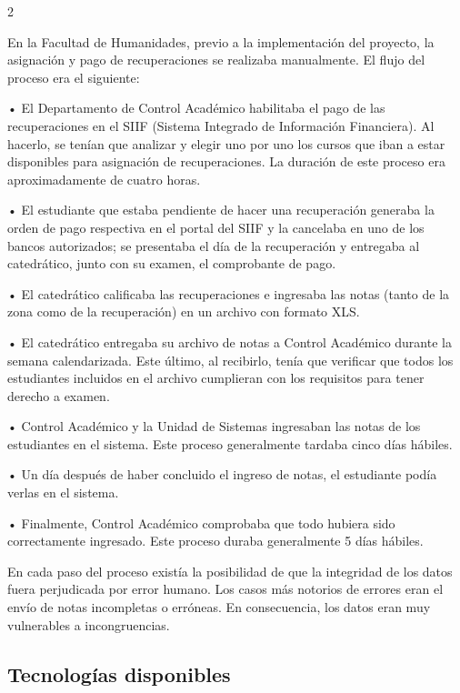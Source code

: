 \documentclass[12pt,spanish,Letterpaper,openany]{book}
\newcommand{\spacethreemilis}{\vspace{3mm}}
\newcommand{\spacetwomilis}{\vspace{2mm}}
\begin{document}
\begin {multicols}{2}
\spacetwomilis

En la Facultad de Humanidades, previo a la implementación del proyecto, la asignación y pago de recuperaciones se realizaba manualmente. El flujo del proceso era el siguiente:

• El Departamento de Control Académico habilitaba el pago de las recuperaciones en el SIIF (Sistema Integrado de Información Financiera). Al hacerlo, se tenían que analizar y elegir uno por uno los cursos que iban a estar disponibles para asignación de recuperaciones. La duración de este proceso era aproximadamente de cuatro horas.

• El estudiante que estaba pendiente de hacer una recuperación generaba la orden de pago respectiva en el portal del SIIF y la cancelaba en uno de los bancos autorizados; se presentaba el día de la recuperación y entregaba al catedrático, junto con su examen, el comprobante de pago.

\spacethreemilis
\spacethreemilis

• El catedrático calificaba las recuperaciones e ingresaba las notas (tanto de la zona como de la recuperación) en un archivo con formato XLS.

• El catedrático entregaba su archivo de notas a Control Académico durante la semana calendarizada. Este último, al recibirlo, tenía que verificar que todos los estudiantes incluidos en el archivo cumplieran con los requisitos para tener derecho a examen.

• Control Académico y la Unidad de Sistemas ingresaban las notas de los estudiantes en el sistema. Este proceso generalmente tardaba cinco días hábiles.

• Un día después de haber concluido el ingreso de notas, el estudiante podía verlas en el sistema.

• Finalmente, Control Académico comprobaba que todo hubiera sido correctamente ingresado. Este proceso duraba generalmente 5 días hábiles.

En cada paso del proceso existía la posibilidad de que la integridad de los datos fuera perjudicada por error humano. Los casos más notorios de errores eran el envío de notas incompletas o erróneas. En consecuencia, los datos eran muy vulnerables a incongruencias.

\hypertarget{tecnologias-disponibles}{%
\subsection{Tecnologías disponibles}\label{tecnologias-disponibles}}


\end{multicols}
\end{document}
